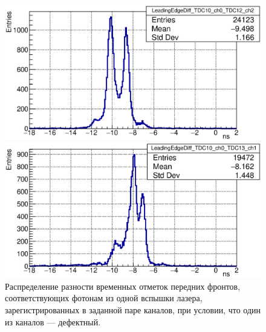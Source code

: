 \begin{figure}[H]
\begin{minipage}[b]{0.49\textwidth}
\includegraphics[width=1.0\textwidth]{pictures/23_LeadingEdgeDiff_TDC10_ch0_TDC12_ch2_feb2017.eps}
\end{minipage}
\hspace{0.01\textwidth}
\begin{minipage}[b]{0.49\textwidth}
\includegraphics[width=1.0\textwidth]{pictures/23_LeadingEdgeDiff_TDC10_ch0_TDC13_ch1_feb2017.eps}
\end{minipage}
\caption{Распределение разности временных отметок передних фронтов, соответствующих фотонам из одной вспышки лазера, зарегистрированных в заданной паре каналов, при условии, что один из каналов --- дефектный.}
\label{fig:LeadingEdgeDiffMultiplePeaks}
\end{figure}

